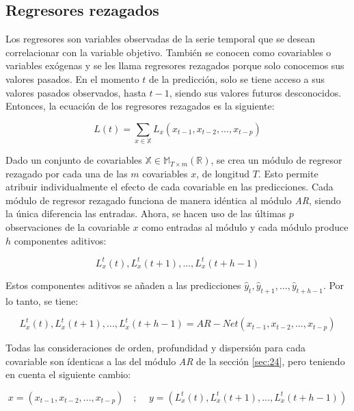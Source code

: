 \documentclass[12pt,twoside]{article}
\begin{document}
\subsection{Regresores rezagados}\label{sec:28}

Los regresores son variables observadas de la serie temporal que se desean correlacionar con la variable objetivo. También se conocen como covariables o variables exógenas y se les llama regresores rezagados porque solo conocemos sus valores pasados. En el momento $t$ de la predicción, solo se tiene acceso a sus valores pasados observados, hasta $t-1$, siendo sus valores futuros desconocidos. Entonces, la ecuación de los regresores rezagados es la siguiente:

\begin{equation}
L(t)=\sum_{x \in \mathbb{X}}L_x(x_{t-1},x_{t-2},...,x_{t-p})
\end{equation}

Dado un conjunto de covariables $\mathbb{X} \in \mathbb{M}_{T \times m}(\mathbb{R})$, se crea un módulo de regresor rezagado por cada una de las $m$ covariables $x$, de longitud $T$. Esto permite atribuir individualmente el efecto de cada covariable en las predicciones. Cada módulo de regresor rezagado funciona de manera idéntica al módulo \textit{AR}, siendo la única diferencia las entradas. Ahora, se hacen uso de las últimas $p$ observaciones de la covariable $x$ como entradas al módulo y cada módulo produce $h$ componentes aditivos:

\begin{equation}
L_x^t(t),L_x^t(t+1),...,L_x^t(t+h-1)
\end{equation}

Estos componentes aditivos se añaden a las predicciones $\hat{y}_{t},\hat{y}_{t+1},...,\hat{y}_{t+h-1}$. Por lo tanto, se tiene:

\begin{equation}
L_x^t(t),L_x^t(t+1),...,L_x^t(t+h-1) = AR-Net(x_{t-1},x_{t-2},...,x_{t-p})
\end{equation}

Todas las consideraciones de orden, profundidad y dispersión para cada covariable son ídenticas a las del módulo \textit{AR} de la sección \ref{sec:24}, pero teniendo en cuenta el siguiente cambio: 

\begin{equation}
x = (x_{t-1},x_{t-2},...,x_{t-p}) \quad \text{; }\quad y=(L_x^t(t),L_x^t(t+1),...,L_x^t(t+h-1))
\end{equation}
\end{document}
